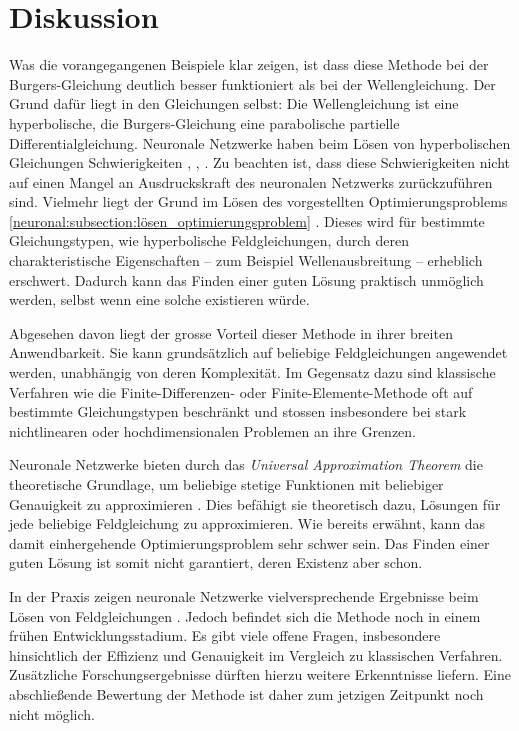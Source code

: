 %
%
%
%

\section{Diskussion}\label{neuronal:section:diskussion}

Was die vorangegangenen Beispiele klar zeigen, ist dass diese Methode bei der Burgers-Gleichung deutlich besser funktioniert als bei der Wellengleichung.
Der Grund dafür liegt in den Gleichungen selbst: 
Die Wellengleichung ist eine hyperbolische, die Burgers-Gleichung eine parabolische partielle Differentialgleichung.
Neuronale Netzwerke haben beim Lösen von hyperbolischen Gleichungen Schwierigkeiten \cite{neuronal:hyperbolisch_1}, \cite{neuronal:hyperbolisch_2}, \cite{neuronal:hyperbolisch_3}.
Zu beachten ist, dass diese Schwierigkeiten nicht auf einen Mangel an Ausdruckskraft des neuronalen Netzwerks zurückzuführen sind.
Vielmehr liegt der Grund im Lösen des vorgestellten Optimierungsproblems \ref{neuronal:subsection:lösen_optimierungsproblem} \cite{neuronal:hyperbolisch_4}.
Dieses wird für bestimmte Gleichungstypen, wie hyperbolische Feldgleichungen, durch deren charakteristische Eigenschaften -- zum Beispiel Wellenausbreitung -- erheblich erschwert.
Dadurch kann das Finden einer guten Lösung praktisch unmöglich werden, selbst wenn eine solche existieren würde.

Abgesehen davon liegt der grosse Vorteil dieser Methode in ihrer breiten Anwendbarkeit.
Sie kann grundsätzlich auf beliebige Feldgleichungen angewendet werden, unabhängig von deren Komplexität.
Im Gegensatz dazu sind klassische Verfahren wie die Finite-Differenzen- oder Finite-Elemente-Methode oft auf bestimmte Gleichungstypen beschränkt und stossen insbesondere bei stark nichtlinearen oder hochdimensionalen Problemen an ihre Grenzen.

Neuronale Netzwerke bieten durch das \emph{Universal Approximation Theorem} die theoretische Grundlage, um beliebige stetige Funktionen mit beliebiger Genauigkeit zu approximieren \cite{neuronal:universal_approximation_theorem}.
Dies befähigt sie theoretisch dazu, Lösungen für jede beliebige Feldgleichung zu approximieren.
Wie bereits erwähnt, kann das damit einhergehende Optimierungsproblem sehr schwer sein.
Das Finden einer guten Lösung ist somit nicht garantiert, deren Existenz aber schon.

In der Praxis zeigen neuronale Netzwerke vielversprechende Ergebnisse beim Lösen von Feldgleichungen \cite{neuronal:pinns}.
Jedoch befindet sich die Methode noch in einem frühen Entwicklungsstadium.
Es gibt viele offene Fragen, insbesondere hinsichtlich der Effizienz und Genauigkeit im Vergleich zu klassischen Verfahren.
Zusätzliche Forschungsergebnisse dürften hierzu weitere Erkenntnisse liefern.
Eine abschließende Bewertung der Methode ist daher zum jetzigen Zeitpunkt noch nicht möglich.
